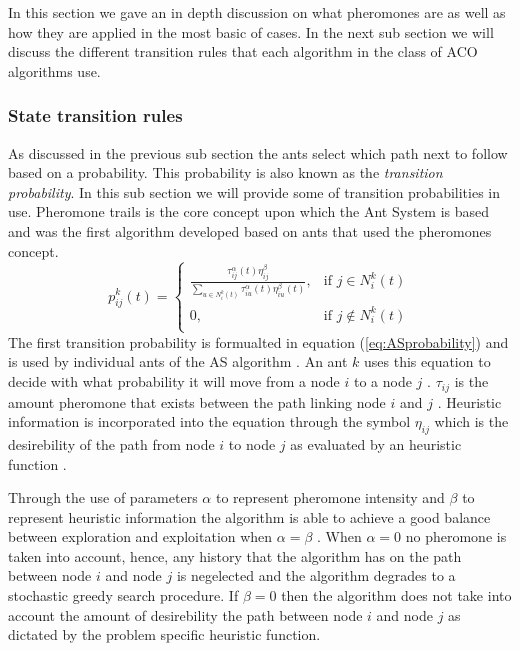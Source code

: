 In this section we gave an in depth discussion on what pheromones are as well as how they are applied in the most basic of cases. In the next sub section we will discuss the different transition rules that each algorithm in the class of ACO algorithms use.
\subsubsection{State transition rules}
 As discussed in the previous sub section the ants select which path next to follow based on a probability. This probability is also known as the \emph{transition probability}. In this sub section we will provide some of transition probabilities in use. Pheromone trails is the core concept upon which the Ant System is based and was the first algorithm developed based on ants that used the pheromones concept\cite{CompuIntelligenceIntro}. 
\begin{equation}
\label{eq:ASprobability}
p^k_{ij}(t) =
\begin{cases}
	\frac{\tau^{\alpha}_{ij}(t)\eta^{\beta}_{ij}}{\sum_{u \in N^k_i(t)} {\tau^{\alpha}_{iu}(t)\eta^{\beta}_{iu}(t)}}, &\text{if $j \in N^k_i(t)$}\\
	0, &\text{if $j \notin N^k_i(t)$}\\
\end{cases}
\end{equation}
The first transition probability is formualted in equation (\ref{eq:ASprobability}) and is used by individual ants of the AS algorithm \cite{CompuIntelligenceIntro,AntSurvey}. An ant $k$ uses this equation to decide with what probability it will move from a node $i$ to a node $j$ \cite{CompuIntelligenceIntro}. $\tau_{ij}$ is the amount pheromone that exists between the path linking node $i$ and $j$ \cite{CompuIntelligenceIntro,AntsAndStigmergy}. Heuristic information is incorporated into the equation through the symbol $\eta_{ij}$ which is the desirebility of the path from node $i$ to node $j$ as evaluated by an heuristic function \cite{CompuIntelligenceIntro,AntsAndStigmergy}. 

Through the use of parameters $\alpha$ to represent pheromone intensity and $\beta$ to represent heuristic information the algorithm is able to achieve a good balance between exploration and exploitation when $\alpha=\beta$ \cite{CompuIntelligenceIntro}. When $\alpha = 0$ no pheromone is taken into account, hence, any history that the algorithm has on the path between node $i$ and node $j$ is negelected and the algorithm degrades to a stochastic greedy search procedure. If $\beta = 0$ then the algorithm does not take into account the amount of desirebility the path between node $i$ and node $j$ as dictated by the problem specific heuristic function.

